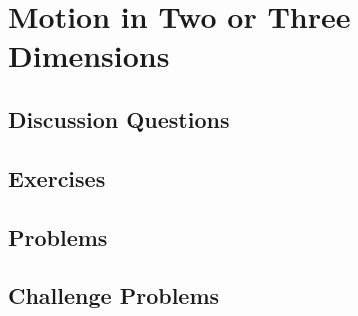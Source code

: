 
\chapter{Motion in Two or Three Dimensions}

\section{Discussion Questions}

\discussion{}

\discussion{}

\discussion{}

\discussion{}

\discussion{}

\discussion{}

\discussion{}

\discussion{}

\discussion{}

\discussion{}

\discussion{}

\discussion{}

\discussion{}

\discussion{}

\discussion{}

\discussion{}

\section{Exercises}

\section{Problems}

\section{Challenge Problems}
